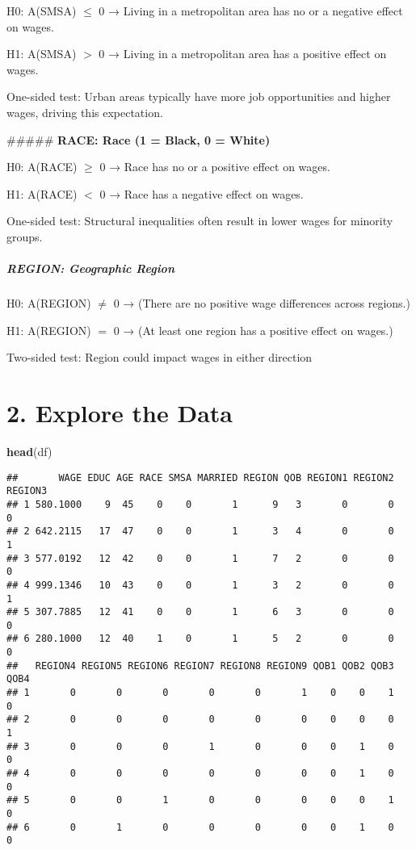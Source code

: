 \documentclass[
]{article}
\newenvironment{Shaded}{\begin{snugshade}}{\end{snugshade}}
\newcommand{\FunctionTok}[1]{\textcolor[rgb]{0.13,0.29,0.53}{\textbf{#1}}}
\newcommand{\NormalTok}[1]{#1}
\begin{document}
H0: A(SMSA) \(\leq\) 0 → Living in a metropolitan area has no or a
negative effect on wages.

H1: A(SMSA) \(>\) 0 → Living in a metropolitan area has a positive
effect on wages.

One-sided test: Urban areas typically have more job opportunities and
higher wages, driving this expectation.

\#\#\#\#\# \textbf{RACE: Race (1 = Black, 0 = White)}

H0: A(RACE) \(\geq\) 0 → Race has no or a positive effect on wages.

H1: A(RACE) \(<\) 0 → Race has a negative effect on wages.

One-sided test: Structural inequalities often result in lower wages for
minority groups.

\subparagraph{\texorpdfstring{\textbf{REGION: Geographic
Region}}{REGION: Geographic Region}}\label{region-geographic-region}

H0: A(REGION) \(\neq\) 0 → (There are no positive wage differences
across regions.)

H1: A(REGION) \(=\) 0 → (At least one region has a positive effect on
wages.)

Two-sided test: Region could impact wages in either direction

\section{\texorpdfstring{\textbf{2. Explore the
Data}}{2. Explore the Data}}\label{explore-the-data}

\begin{Shaded}
\begin{Highlighting}[]
\FunctionTok{head}\NormalTok{(df)}
\end{Highlighting}
\end{Shaded}

\begin{verbatim}
##       WAGE EDUC AGE RACE SMSA MARRIED REGION QOB REGION1 REGION2 REGION3
## 1 580.1000    9  45    0    0       1      9   3       0       0       0
## 2 642.2115   17  47    0    0       1      3   4       0       0       1
## 3 577.0192   12  42    0    0       1      7   2       0       0       0
## 4 999.1346   10  43    0    0       1      3   2       0       0       1
## 5 307.7885   12  41    0    0       1      6   3       0       0       0
## 6 280.1000   12  40    1    0       1      5   2       0       0       0
##   REGION4 REGION5 REGION6 REGION7 REGION8 REGION9 QOB1 QOB2 QOB3 QOB4
## 1       0       0       0       0       0       1    0    0    1    0
## 2       0       0       0       0       0       0    0    0    0    1
## 3       0       0       0       1       0       0    0    1    0    0
## 4       0       0       0       0       0       0    0    1    0    0
## 5       0       0       1       0       0       0    0    0    1    0
## 6       0       1       0       0       0       0    0    1    0    0
\end{verbatim}
\end{document}
